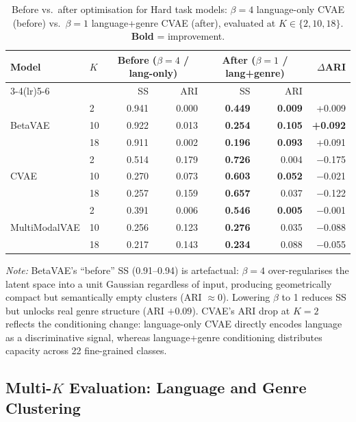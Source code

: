 \documentclass{article}
\begin{document}
\begin{table}[H]
\centering
\caption{Before vs.\ after optimisation for Hard task models: $\beta\!=\!4$ language-only CVAE (before) vs.\ $\beta\!=\!1$ language+genre CVAE (after), evaluated at $K\!\in\!\{2,10,18\}$. \textbf{Bold} = improvement.}
\label{tab:before_after}
\small
\begin{tabular}{llrrrrr}
\toprule
\textbf{Model} & \textbf{$K$} & \multicolumn{2}{c}{\textbf{Before ($\beta\!=\!4$ / lang-only)}} & \multicolumn{2}{c}{\textbf{After ($\beta\!=\!1$ / lang+genre)}} & \textbf{$\Delta$ARI} \\
\cmidrule(lr){3-4}\cmidrule(lr){5-6}
 & & SS & ARI & SS & ARI & \\
\midrule
\multirow{3}{*}{BetaVAE}
 & 2  & 0.941 & 0.000 & \textbf{0.449} & \textbf{0.009} & +0.009 \\
 & 10 & 0.922 & 0.013 & \textbf{0.254} & \textbf{0.105} & \textbf{+0.092} \\
 & 18 & 0.911 & 0.002 & \textbf{0.196} & \textbf{0.093} & +0.091 \\
\midrule
\multirow{3}{*}{CVAE}
 & 2  & 0.514 & 0.179 & \textbf{0.726} & 0.004 & $-$0.175 \\
 & 10 & 0.270 & 0.073 & \textbf{0.603} & \textbf{0.052} & $-$0.021 \\
 & 18 & 0.257 & 0.159 & \textbf{0.657} & 0.037 & $-$0.122 \\
\midrule
\multirow{3}{*}{MultiModalVAE}
 & 2  & 0.391 & 0.006 & \textbf{0.546} & \textbf{0.005} & $-$0.001 \\
 & 10 & 0.256 & 0.123 & \textbf{0.276} & 0.035 & $-$0.088 \\
 & 18 & 0.217 & 0.143 & \textbf{0.234} & 0.088 & $-$0.055 \\
\bottomrule
\end{tabular}
\end{table}

\textit{Note:} BetaVAE's ``before'' SS (0.91--0.94) is artefactual: $\beta\!=\!4$ over-regularises the latent space into a unit Gaussian regardless of input, producing geometrically compact but semantically empty clusters (ARI $\approx 0$). Lowering $\beta$ to 1 reduces SS but unlocks real genre structure (ARI $+0.09$). CVAE's ARI drop at $K\!=\!2$ reflects the conditioning change: language-only CVAE directly encodes language as a discriminative signal, whereas language+genre conditioning distributes capacity across 22 fine-grained classes.

\subsection{Multi-$K$ Evaluation: Language and Genre Clustering}
\label{sec:language_eval}
\end{document}
